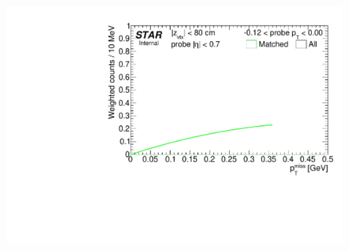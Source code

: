 \begin{figure}[ht]
{  \includegraphics[width=\linewidth,page=9]{graphics/correctionsToEff/TOF_tagAndProbe/Fitting_effVsPt_mc.CPT.pdf}
}%
\end{figure}
